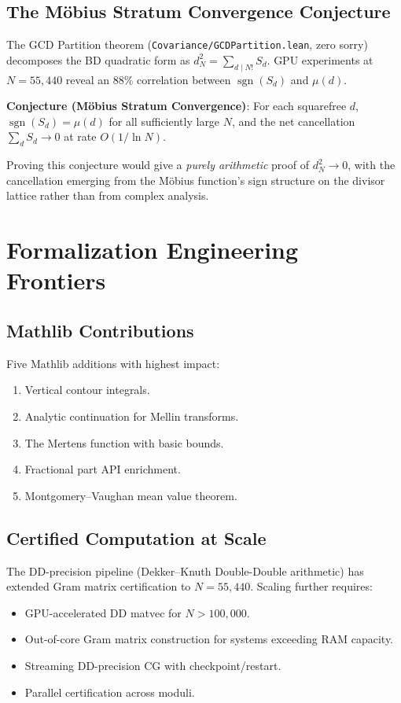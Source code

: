 \documentclass[11pt,a4paper]{article}
\begin{document}
\subsection{The M\"obius Stratum Convergence Conjecture}

The GCD Partition theorem (\texttt{Covariance/GCDPartition.lean},
zero sorry) decomposes the BD quadratic form as
$d_N^2 = \sum_{d \mid N!} S_d$.
GPU experiments at $N = 55{,}440$ reveal an 88\% correlation between
$\operatorname{sgn}(S_d)$ and $\mu(d)$.

\textbf{Conjecture (M\"obius Stratum Convergence)}: For each
squarefree $d$, $\operatorname{sgn}(S_d) = \mu(d)$ for all
sufficiently large $N$, and the net cancellation
$\sum_d S_d \to 0$ at rate $O(1/\ln N)$.

Proving this conjecture would give a \emph{purely arithmetic} proof
of $d_N^2 \to 0$, with the cancellation emerging from the
M\"obius function's sign structure on the divisor lattice rather
than from complex analysis.

\section{Formalization Engineering Frontiers}

\subsection{Mathlib Contributions}

Five Mathlib additions with highest impact:
\begin{enumerate}
  \item Vertical contour integrals.
  \item Analytic continuation for Mellin transforms.
  \item The Mertens function with basic bounds.
  \item Fractional part API enrichment.
  \item Montgomery--Vaughan mean value theorem.
\end{enumerate}

\subsection{Certified Computation at Scale}

The DD-precision pipeline (Dekker--Knuth Double-Double arithmetic)
has extended Gram matrix certification to $N = 55{,}440$. Scaling
further requires:
\begin{itemize}
  \item GPU-accelerated DD matvec for $N > 100{,}000$.
  \item Out-of-core Gram matrix construction for systems exceeding
    RAM capacity.
  \item Streaming DD-precision CG with checkpoint/restart.
  \item Parallel certification across moduli.
\end{itemize}
\end{document}
